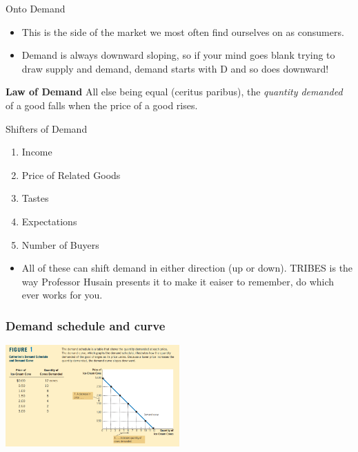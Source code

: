 \documentclass[aspectratio=169]{beamer}
\begin{document}
\begin{frame}{Onto Demand}
    \begin{itemize}
        \item This is the side of the market we most often find ourselves on as consumers.
        \vspace{5mm}
        \item Demand is always downward sloping, so if your mind goes blank trying to draw supply and demand, demand starts with D and so does downward!
    \end{itemize}
    \vspace{5mm}
    \begin{block}{\textbf{Law of Demand}}
        All else being equal (ceritus paribus), the \textit{quantity demanded} of a good falls when the price of a good rises.
    \end{block}
\end{frame}

\begin{frame}{Shifters of Demand}
    \begin{enumerate}
        \item<1-> Income
        \item<2-> Price of Related Goods
        \item<3-> Tastes
        \item<4-> Expectations
        \item<5-> Number of Buyers
    \end{enumerate}
    \vspace{5mm}
    \begin{itemize}
        \item<6-> All of these can shift demand in either direction (up or down). TRIBES is the way Professor Husain presents it to make it eaiser to remember, do which ever works for you.
    \end{itemize}
\end{frame}



\begin{frame}
    \frametitle{Demand schedule and curve}
    \centering
    \includegraphics[width = 0.5\textwidth,keepaspectratio]{demand_curve.png}
\end{frame}
\end{document}
